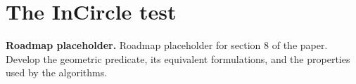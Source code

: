 \chapter{The InCircle test}

\noindent\textbf{Roadmap placeholder.}
Roadmap placeholder for section 8 of the paper. Develop the geometric
predicate, its equivalent formulations, and the properties used by the
algorithms.
